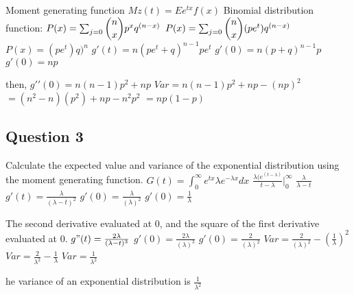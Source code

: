 \documentclass[
]{article}
\begin{document}
Moment generating function \(Mz(t) = Ee^{tx}f(x)\) Binomial distribution
function: \(P(x) = \sum_{j=0} \dbinom{n}{x}p^xq^{(n-x)}\)
\(P(x) = \sum_{j=0} \dbinom{n}{x}(pe^t)q^{(n-x)}\) \(P(x) = (pe^t)q)^n\)
\(g'(t) = n(pe^t + q)^{n-1}pe^t\) \(g'(0) = n(p + q)^{n-1}p\)
\(g'(0) = np\)

then, \(g′′(0)=n(n−1)p^2+np\) \(Var=n(n−1)p^2+np−(np)^2\)
\(=(n^2−n)(p^2)+np−n^2p^2\) \(=np(1−p)\)

\hypertarget{question-3}{%
\subsection{Question 3}\label{question-3}}

Calculate the expected value and variance of the exponential
distribution using the moment generating function.
\(G(t) = \int_{0}^\infty e^{tx} \lambda e^{- \lambda x}dx\)
\(\frac {\lambda(e^{(t- \lambda)} }{t- \lambda} \vert_0 ^\infty\)
\(\frac {\lambda}{\lambda - t}\)
\(g′(t) = \frac {\lambda}{(\lambda - t)^2}\)
\(g′(0) = \frac {\lambda}{(\lambda)^2}\) \(g′(0) = \frac {1}{\lambda}\)

The second derivative evaluated at 0, and the square of the first
derivative evaluated at 0. \(g"(t) = \frac {2\lambda}{(\lambda - t)^3}\)
\(g′(0) = \frac {2\lambda}{(\lambda)^3}\)
\(g′(0) = \frac {2}{(\lambda)^2}\)
\(Var = \frac {2}{(\lambda)^2} - ( \frac {1}{\lambda} )^2\)
\(Var = \frac {2}{\lambda^2} - \frac {1}{\lambda}\)
\(Var = \frac {1}{\lambda^2}\)

he variance of an exponential distribution is \(\frac {1}{\lambda^2}\)
\end{document}
